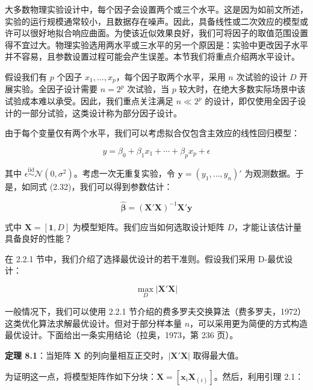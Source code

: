 \documentclass{ctexart}
\begin{document}
大多数物理实验设计中，每个因子会设置两个或三个水平。这是因为如前文所述，实验的运行规模通常较小，且数据存在噪声。因此，具备线性或二次效应的模型或许可以很好地拟合响应曲面。为使该近似效果良好，我们可将因子的取值范围设置得不宜过大。物理实验选用两水平或三水平的另一个原因是：实验中更改因子水平并不容易，且参数设置过程可能会产生误差。本节我们将重点介绍两水平设计。

假设我们有 $p$ 个因子 $x_1,\dots,x_p$，每个因子取两个水平，采用 $n$ 次试验的设计 $D$ 开展实验。全因子设计需要 $n=2^p$ 次试验，当 $p$ 较大时，在绝大多数实际场景中该试验成本难以承受。因此，我们重点关注满足 $n\ll2^p$ 的设计，即仅使用全因子设计的一部分试验，这类设计称为部分因子设计。

由于每个变量仅有两个水平，我们可以考虑拟合仅包含主效应的线性回归模型：

\begin{equation*}
y=\beta_0+\beta_1x_1+\cdots+\beta_px_p+\epsilon
\tag{8.1}
\end{equation*}

其中 $\epsilon\stackrel{\text{iid}}{\sim}\mathcal{N}(0,\sigma^2)$。考虑一次无重复实验，令 $\boldsymbol{y}=(y_1,\dots,y_n)'$ 为观测数据。于是，如同式 (2.32)，我们可以得到参数估计：

\begin{equation*}
\widehat{\boldsymbol{\beta}} = (\boldsymbol{X}'\boldsymbol{X})^{-1}\boldsymbol{X}'\boldsymbol{y}
\end{equation*}

式中 $\boldsymbol{X}=[\boldsymbol1,D]$ 为模型矩阵。我们应当如何选取设计矩阵 $D$，才能让该估计量具备良好的性能？

在 2.2.1 节中，我们介绍了选择最优设计的若干准则。假设我们采用 D‑最优设计：

\begin{equation*}
\max_{D}|\boldsymbol{X}'\boldsymbol{X}|
\end{equation*}

一般情况下，我们可以使用 2.2.1 节介绍的费多罗夫交换算法（费多罗夫，1972）这类优化算法求解最优设计。但对于部分样本量 $n$，可以采用更为简便的方式构造最优设计。下面给出一条实用结论（拉奥，1973，第 236 页）。

\begin{mdquote}
\textbf{定理 8.1}：当矩阵 $\boldsymbol{X}$ 的列向量相互正交时，$|\boldsymbol{X}'\boldsymbol{X}|$ 取得最大值。
\end{mdquote}

为证明这一点，将模型矩阵作如下分块：$\boldsymbol{X}=[\boldsymbol{x}_i\boldsymbol{X}_{(i)}]$。然后，利用引理 2.1：
\end{document}
